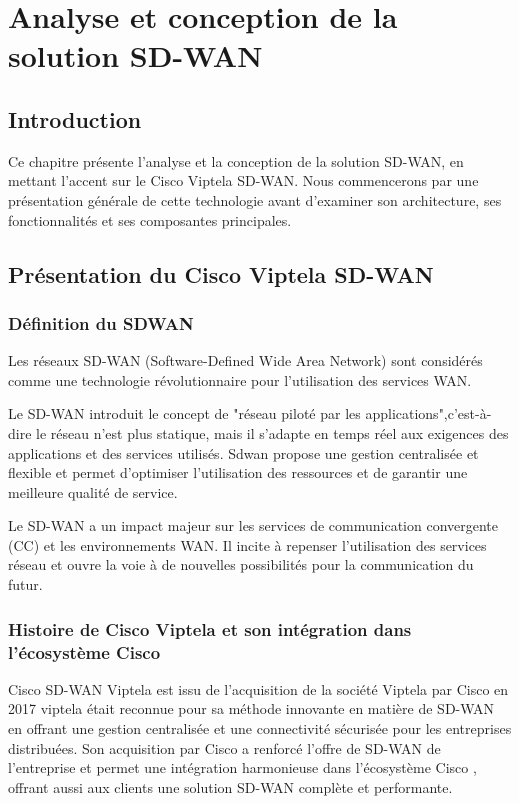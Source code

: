 \chapter{Analyse et conception de la solution SD-WAN }



\section*{Introduction }
Ce chapitre présente l'analyse et la conception de la solution SD-WAN, en mettant l'accent sur le Cisco Viptela SD-WAN. Nous commencerons par une présentation générale de cette technologie avant d'examiner son architecture, ses fonctionnalités et ses composantes principales.

\section{Présentation du Cisco Viptela SD-WAN }
\subsection{Définition du  SDWAN }

Les réseaux SD-WAN (Software-Defined Wide Area Network) sont considérés comme une technologie révolutionnaire pour l'utilisation des services WAN. 

Le SD-WAN introduit le concept de "réseau piloté par les applications",c’est-à-dire le réseau n'est plus statique, mais il s'adapte en temps réel aux exigences des applications et des services utilisés. Sdwan propose une gestion centralisée et flexible et permet d'optimiser l'utilisation des ressources et de garantir une meilleure qualité de service.

Le SD-WAN a un impact majeur sur les services de communication convergente (CC) et les environnements WAN. Il incite à repenser l'utilisation des services réseau et ouvre la voie à de nouvelles possibilités pour la communication du futur.

\subsection{Histoire de Cisco Viptela et son intégration dans l'écosystème Cisco }

Cisco SD-WAN Viptela est issu de l'acquisition de la société Viptela par Cisco en 2017 viptela était reconnue pour sa méthode innovante en matière de SD-WAN en offrant une gestion centralisée et une connectivité sécurisée pour les entreprises distribuées. Son acquisition par Cisco a renforcé l'offre de SD-WAN de l'entreprise et permet une intégration harmonieuse dans l'écosystème Cisco , offrant aussi aux clients une solution SD-WAN complète et performante.
